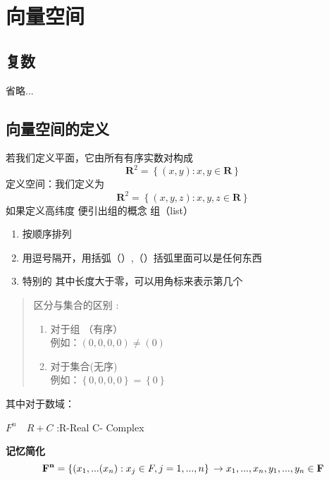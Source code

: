 \section{向量空间}

\subsection{复数}

省略...
\subsection{向量空间的定义}
若我们定义平面，它由所有有序实数对构成
\begin{equation}
    \textbf{R}^{2} =\left\{ \left ( x,y \right ):x,y\in \textbf{R}\right\}
\end{equation}
定义空间：我们定义为
\begin{equation}
    \textbf{R}^{2} =\left\{ \left ( x,y,z\right ):x,y,z\in \textbf{R}\right\}
\end{equation}
如果定义高纬度 便引出组的概念
组（list）
\begin{enumerate}
    \item 按顺序排列
    \item 用逗号隔开，用括弧（）,（）括弧里面可以是任何东西
    \item 特别的 其中长度大于零，可以用角标来表示第几个
\end{enumerate}

\begin{quote}
    区分与集合的区别 :
    \begin{enumerate}
        \item 对于组  （有序）\\
        例如：$\left ( 0,0,0,0 \right )\neq \left ( 0 \right )$
        \item 对于集合(无序) \\
        例如：$\left\{0,0,0,0 \right\}=\left\{ 0\right\}$
    \end{enumerate}
\end{quote}
\par 其中对于数域：\\
\begin{center}
    $F^n \quad R+C$ :\quad R-Real \quad C- Complex 
\end{center}

{\bfseries 记忆简化}
\begin{equation}
    \mathbf{F^{n}}=\left\{ (x_{1},...(x_{n}):x_{j}\in F,j=1,...,n\right\}\\
    \to x_{1},...,x_{n},y_{1},...,y_{n} \in\textbf{F}\\
\end{equation}

